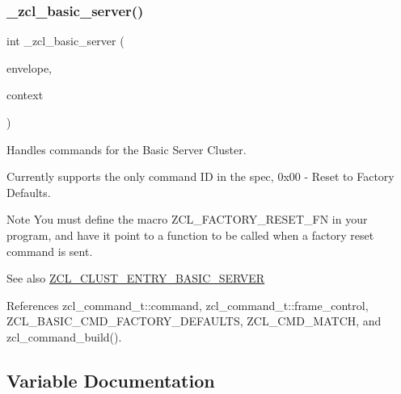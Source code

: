 \subsubsection{\texorpdfstring{\+\_\+zcl\+\_\+basic\+\_\+server()}{\_zcl\_basic\_server()}}
{\footnotesize\ttfamily int \+\_\+zcl\+\_\+basic\+\_\+server (\begin{DoxyParamCaption}\item[{const \hyperlink{structwpan__envelope__t}{wpan\+\_\+envelope\+\_\+t} \hyperlink{group__hal_gaef060b3456fdcc093a7210a762d5f2ed}{F\+AR} $\ast$}]{envelope,  }\item[{void \hyperlink{group__hal_gaef060b3456fdcc093a7210a762d5f2ed}{F\+AR} $\ast$}]{context }\end{DoxyParamCaption})}



Handles commands for the Basic Server Cluster. 

Currently supports the only command ID in the spec, 0x00 -\/ Reset to Factory Defaults.

\begin{DoxyNote}{Note}
You must define the macro Z\+C\+L\+\_\+\+F\+A\+C\+T\+O\+R\+Y\+\_\+\+R\+E\+S\+E\+T\+\_\+\+FN in your program, and have it point to a function to be called when a factory reset command is sent.
\end{DoxyNote}
\begin{DoxySeeAlso}{See also}
\hyperlink{group__zcl__basic_gad8336fcfc2729c8deb86eda7f125f271}{Z\+C\+L\+\_\+\+C\+L\+U\+S\+T\+\_\+\+E\+N\+T\+R\+Y\+\_\+\+B\+A\+S\+I\+C\+\_\+\+S\+E\+R\+V\+ER} 
\end{DoxySeeAlso}


References zcl\+\_\+command\+\_\+t\+::command, zcl\+\_\+command\+\_\+t\+::frame\+\_\+control, Z\+C\+L\+\_\+\+B\+A\+S\+I\+C\+\_\+\+C\+M\+D\+\_\+\+F\+A\+C\+T\+O\+R\+Y\+\_\+\+D\+E\+F\+A\+U\+L\+TS, Z\+C\+L\+\_\+\+C\+M\+D\+\_\+\+M\+A\+T\+CH, and zcl\+\_\+command\+\_\+build().



\subsection{Variable Documentation}
\mbox{\label{group__zcl__basic_ga465778a2b459ad01710dc8f69ec2c19b}} 
